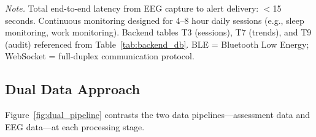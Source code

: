 \vspace{0.5em}
\noindent\textit{Note.} Total end-to-end latency from EEG capture to alert delivery: $<$15 seconds. Continuous monitoring designed for 4--8 hour daily sessions (e.g., sleep monitoring, work monitoring). Backend tables T3 (sessions), T7 (trends), and T9 (audit) referenced from Table~\ref{tab:backend_db}. BLE = Bluetooth Low Energy; WebSocket = full-duplex communication protocol.
\fi %

\label{sec:continuous_monitoring_flow}
\label{tab:continuous_monitoring}

\subsection{Dual Data Approach}
\label{sec:dual_data_approach}

Figure~\ref{fig:dual_pipeline} contrasts the two data pipelines---assessment data and EEG data---at each processing stage.


